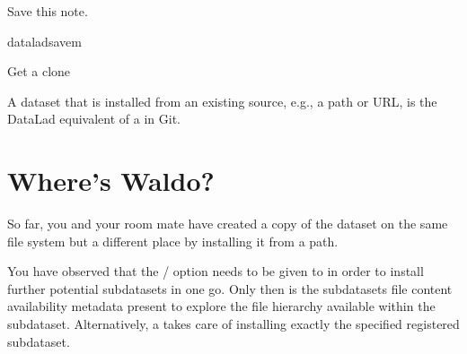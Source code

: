 \sphinxAtStartPar
Save this note.

\begin{sphinxVerbatim}[commandchars=\\\{\}]
dataladsave\PYGZhy{}m
\end{sphinxVerbatim}

\ignorespaces \begin{gitusernote}[label={index-3}, before title={\thetcbcounter\ }, check odd page=true]{Get a clone}
\label{\detokenize{basics/101-116-sharelocal:index-3}}

\sphinxAtStartPar
A dataset that is installed from an existing source, e.g., a path or URL,
is the DataLad equivalent of a  in Git.


\end{gitusernote}

\sphinxstepscope


\section{Where’s Waldo?}
\label{\detokenize{basics/101-117-sharelocal2:where-s-waldo}}\label{\detokenize{basics/101-117-sharelocal2:sharelocal2}}\label{\detokenize{basics/101-117-sharelocal2::doc}}
\sphinxAtStartPar
So far, you and your room mate have created a copy of the 
dataset on the same file system but a different place by installing
it from a path.

\sphinxAtStartPar
You have observed that the /
option needs to be given to 
in order to install further potential subdatasets in one go. Only then
is the subdatasets file content availability metadata present to explore
the file hierarchy available within the subdataset.
Alternatively, a  takes care of installing
exactly the specified registered subdataset.

